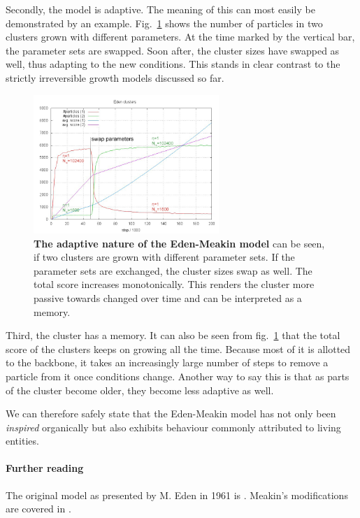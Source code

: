 \documentclass[twocolumn, 10pt]{scrartcl}
\begin{document}
        Secondly, the model is adaptive. The meaning of this can most easily be demonstrated by an example.
        Fig.~\ref{fig-edenadap} shows the number of particles in two clusters grown with different parameters.
        At the time marked by the vertical bar, the parameter sets are swapped. Soon after, the cluster
        sizes have swapped as well, thus adapting to the new conditions. This stands in clear contrast to the
        strictly irreversible growth models discussed so far.
        \begin{figure}
            \center
            \includegraphics[width=7cm]{img/edenadap.png}
            \caption[The adaptive nature of the Eden-Meakin model]
                {\small\textbf{The adaptive nature of the Eden-Meakin model} can be seen, if two clusters are
                grown with different parameter sets. If the parameter sets are exchanged, the cluster sizes
                swap as well. The total score increases monotonically. This renders the cluster more passive
                towards changed over time and can be interpreted as a memory.}
            \label{fig-edenadap}
        \end{figure}

        Third, the cluster has a memory. It can also be seen from fig.~\ref{fig-edenadap} that the total score
        of the clusters keeps on growing all the time. Because most of it is allotted to the backbone, it
        takes an increasingly large number of steps to remove a particle from it once conditions change.
        Another way to say this is that as parts of the cluster become older, they become less adaptive as well.

        We can therefore safely state that the Eden-Meakin model has not only been \emph{inspired} organically
        but also exhibits behaviour commonly attributed to living entities.

        {\small
            \paragraph{Further reading}
            The original model as presented by M. Eden in 1961 is \cite{src-eden}. Meakin's modifications are
            covered in \cite{src-meakin-eden}.
        }
\end{document}
